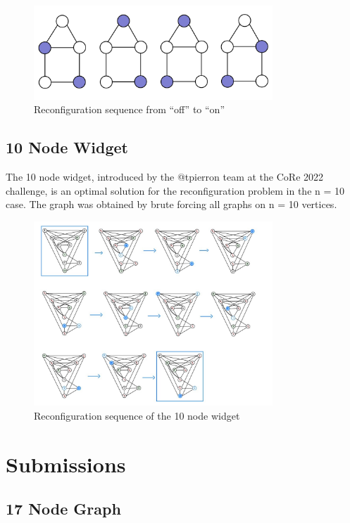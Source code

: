 \documentclass{article}
\begin{document}
\begin{figure}[ht]
\centering
\includegraphics[width=0.8\textwidth]{figures/house-widget.jpg}
\caption{\label{fig:house-widget}Reconfiguration sequence from ``off'' to ``on''}
\end{figure}

\subsection{10 Node Widget}

The 10 node widget, introduced by the @tpierron team at the CoRe 2022 challenge, is an optimal solution for the reconfiguration problem in the n = 10 case. The graph was obtained by brute forcing all graphs on n = 10 vertices.

\begin{figure}[ht]
\centering
\includegraphics[width=0.8\textwidth]{figures/10-widget.jpg}
\caption{\label{fig:10-widget}Reconfiguration sequence of the 10 node widget}
\end{figure}

\section{Submissions}

\subsection{17 Node Graph}
\end{document}
